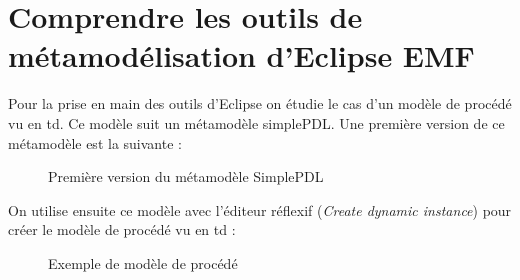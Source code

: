 \section{Comprendre les outils de métamodélisation d'Eclipse EMF}

Pour la prise en main des outils d'Eclipse on étudie le cas d'un modèle de procédé vu en td. Ce modèle suit un métamodèle simplePDL. Une première version de ce métamodèle est la suivante :

\begin{figure}[h]
   \centering
   \caption{Première version du métamodèle SimplePDL}
   \label{pdlv1}
\end{figure}

On utilise ensuite ce modèle avec l'éditeur réflexif (\textit{Create dynamic instance}) pour créer le modèle de procédé vu en td :

\begin{figure}[h]
   \centering
   \caption{Exemple de modèle de procédé}
   \label{process-1}
\end{figure}

